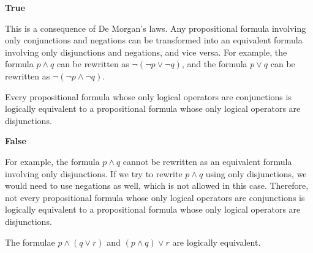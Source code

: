 \begin{mysolution}
    \textbf{True}

    This is a consequence of De Morgan's laws. Any propositional formula involving only conjunctions and negations can be transformed into an equivalent formula involving only disjunctions and negations, and vice versa. For example, the formula $p \wedge q$ can be rewritten as $\neg (\neg p \vee \neg q)$, and the formula $p \vee q$ can be rewritten as $\neg (\neg p \wedge \neg q)$.
\end{mysolution}

\begin{chapex} %
Every propositional formula whose only logical operators are conjunctions is logically equivalent to a propositional formula whose only logical operators are disjunctions.
\end{chapex}

\begin{mysolution}
    \textbf{False}

    For example, the formula $p \wedge q$ cannot be rewritten as an equivalent formula involving only disjunctions. If we try to rewrite $p \wedge q$ using only disjunctions, we would need to use negations as well, which is not allowed in this case. Therefore, not every propositional formula whose only logical operators are conjunctions is logically equivalent to a propositional formula whose only logical operators are disjunctions.
\end{mysolution}

\begin{chapex} %
The formulae $p \wedge (q \vee r)$ and $(p \wedge q) \vee r$ are logically equivalent.
\end{chapex}

